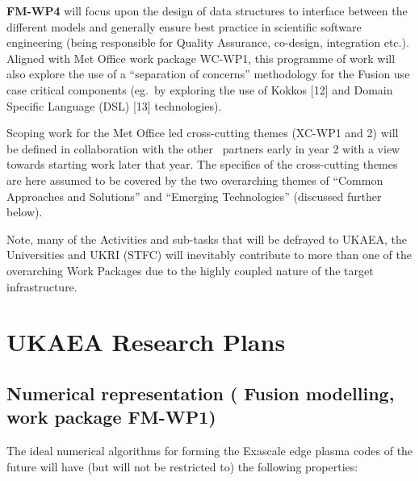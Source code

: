\textbf{FM-WP4} will focus upon the design of data structures to interface between 
the different models and generally ensure best practice in scientific software 
engineering (being responsible for Quality Assurance, co-design, integration etc.). 
Aligned with Met Office work package WC-WP1, this programme of 
work will also explore the use of a ``separation of concerns'' methodology for 
the Fusion use case critical components (eg.\ by exploring the use of Kokkos [12] 
and Domain Specific Language (DSL) [13] technologies).

Scoping work for the Met Office led cross-cutting themes (XC-WP1 and 2) will be 
defined in collaboration with the other \exc \   partners early in year 2 with 
a view towards starting work later that year. The specifics of the cross-cutting 
themes are here assumed to be covered by the two overarching themes of ``Common 
Approaches and Solutions'' and ``Emerging Technologies'' (discussed further below).

Note, many of the Activities and sub-tasks that will be defrayed to UKAEA, the 
Universities and UKRI (STFC) will inevitably contribute to more than one of the 
overarching Work Packages due to the highly coupled nature of the target infrastructure.

\section*{{\huge{}{\textbf{UKAEA Research Plans}}}}

\subsection*{\textbf{Numerical representation (} Fusion modelling, work package  \textbf{FM-WP1})}

The ideal numerical algorithms for forming the Exascale edge plasma codes of the 
future will have (but will not be restricted to) the following properties:


